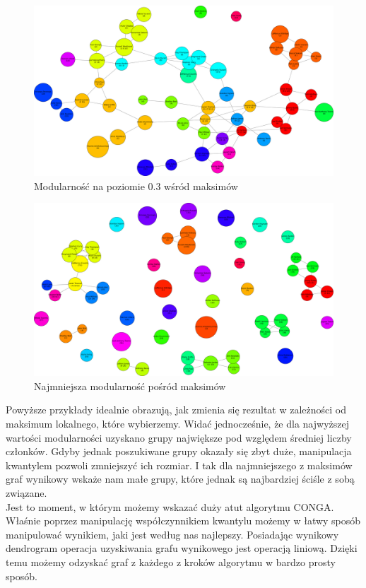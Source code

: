 \documentclass{article}
\begin{document}
\begin{figure}[H]
\centering
\includegraphics[width=\textwidth]{images/is-sample-2.png}
\caption{Modularność na poziomie 0.3 wśród maksimów}
\end{figure}

\begin{figure}[H]
\centering
\includegraphics[width=\textwidth]{images/is-sample-3.png}
\caption{Najmniejsza modularność pośród maksimów}
\end{figure}

Powyższe przykłady idealnie obrazują, jak zmienia się rezultat w zależności od maksimum lokalnego, które wybierzemy. Widać jednocześnie, że dla najwyższej wartości modularności uzyskano grupy największe pod względem średniej liczby członków. Gdyby jednak poszukiwane grupy okazały się zbyt duże, manipulacja kwantylem pozwoli zmniejszyć ich rozmiar. I tak dla najmniejszego z maksimów graf wynikowy wskaże nam małe grupy, które jednak są najbardziej ściśle z sobą związane. \\

Jest to moment, w którym możemy wskazać duży atut algorytmu CONGA. Właśnie poprzez manipulację współczynnikiem kwantylu możemy w łatwy sposób manipulować wynikiem, jaki jest według nas najlepszy. Posiadając wynikowy dendrogram operacja uzyskiwania grafu wynikowego jest operacją liniową. Dzięki temu możemy odzyskać graf z każdego z kroków algorytmu w bardzo prosty sposób. \\
\end{document}
